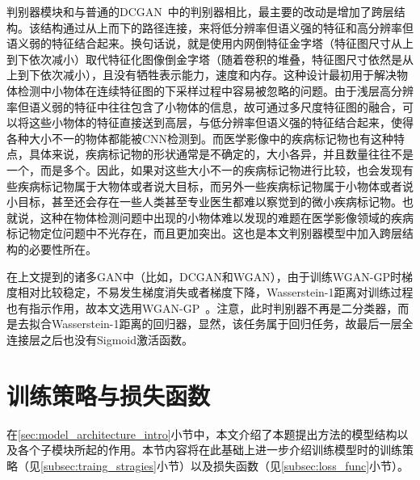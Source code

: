 判别器模块和与普通的DCGAN~\cite{radford2015unsupervised}中的判别器相比，最主要的改动是增加了跨层结构。该结构通过从上而下的路径连接，来将低分辨率但语义强的特征和高分辨率但语义弱的特征结合起来。换句话说，就是使用内网倒特征金字塔（特征图尺寸从上到下依次减小）取代特征化图像倒金字塔（随着卷积的堆叠，特征图尺寸依然是从上到下依次减小），且没有牺牲表示能力，速度和内存。这种设计最初用于解决物体检测中小物体在连续特征图的下采样过程中容易被忽略的问题。由于浅层高分辨率但语义弱的特征中往往包含了小物体的信息，故可通过多尺度特征图的融合，可以将这些小物体的特征直接送到高层，与低分辨率但语义强的特征结合起来，使得各种大小不一的物体都能被CNN检测到。而医学影像中的疾病标记物也有这种特点，具体来说，疾病标记物的形状通常是不确定的，大小各异，并且数量往往不是一个，而是多个。因此，如果对这些大小不一的疾病标记物进行比较，也会发现有些疾病标记物属于大物体或者说大目标，而另外一些疾病标记物属于小物体或者说小目标，甚至还会存在一些人类甚至专业医生都难以察觉到的微小疾病标记物。也就说，这种在物体检测问题中出现的小物体难以发现的难题在医学影像领域的疾病标记物定位问题中不光存在，而且更加突出。这也是本文判别器模型中加入跨层结构的必要性所在。

在上文提到的诸多GAN中（比如，DCGAN和WGAN），由于训练WGAN-GP时梯度相对比较稳定，不易发生梯度消失或者梯度下降，Wasserstein-1距离对训练过程也有指示作用，故本文选用WGAN-GP~\cite{gulrajani2017improved}。注意，此时判别器不再是二分类器，而是去拟合Wasserstein-1距离的回归器，显然，该任务属于回归任务，故最后一层全连接层之后也没有Sigmoid激活函数。

\section{训练策略与损失函数}\label{sec:loss_func_training_stragies}
在\ref{sec:model_architecture_intro}小节中，本文介绍了本题提出方法的模型结构以及各个子模块所起的作用。本节内容将在此基础上进一步介绍训练模型时的训练策略（见\ref{subsec:traing_stragies}小节）以及损失函数（见\ref{subsec:loss_func}小节）。
